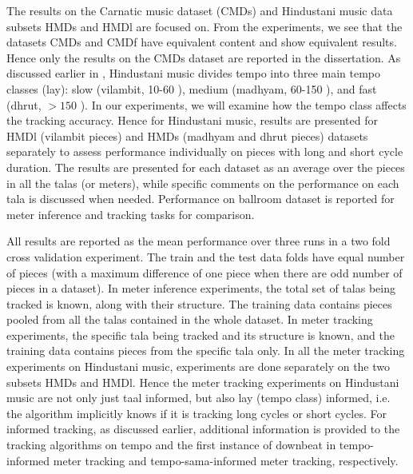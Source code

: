 The results on the Carnatic music dataset (\acrshort{CMDs}) and Hindustani music data subsets \acrshort{HMDs} and \acrshort{HMDl} are focused on. From the experiments, we see that the datasets \acrshort{CMDs} and \acrshort{CMDf} have equivalent content and show equivalent results. Hence only the results on the \acrshort{CMDs} dataset are reported in the dissertation. As discussed earlier in , Hindustani music divides tempo into three main tempo classes (\gls{lay}): slow (\gls{vilambit}, 10-60 \mpm), medium (\gls{madhyam}, 60-150 \mpm), and fast (\gls{dhrut}, $>150$ \mpm). In our experiments, we will examine how the tempo class affects the tracking accuracy. Hence for Hindustani music, results are presented for \acrshort{HMDl} (\gls{vilambit} pieces) and \acrshort{HMDs} (\gls{madhyam} and \gls{dhrut} pieces) datasets separately to assess performance individually on pieces with long and short cycle duration. The results are presented for each dataset as an average over the pieces in all the \glspl{tala} (or meters), while specific comments on the performance on each \gls{tala} is discussed when needed. Performance on ballroom dataset is reported for meter inference and tracking tasks for comparison. 

All results are reported as the mean performance over three runs in a two fold cross validation experiment. The train and the test data folds have equal number of pieces (with a maximum difference of one piece when there are odd number of pieces in a dataset). In meter inference experiments, the total set of \glspl{tala} being tracked is known, along with their structure. The training data contains pieces pooled from all the \glspl{tala} contained in the whole dataset. In meter tracking experiments, the specific \gls{tala} being tracked and its structure is known, and the training data contains pieces from the specific \gls{tala} only. In all the meter tracking experiments on Hindustani music, experiments are done separately on the two subsets \acrshort{HMDs} and \acrshort{HMDl}. Hence the meter tracking experiments on Hindustani music are not only just \gls{taal} informed, but also \gls{lay} (tempo class) informed, i.e. the algorithm implicitly knows if it is tracking long cycles or short cycles. For informed tracking, as discussed earlier, additional information is provided to the tracking algorithms on tempo and the first instance of downbeat in tempo-informed meter tracking and tempo-sama-informed meter tracking, respectively. 

